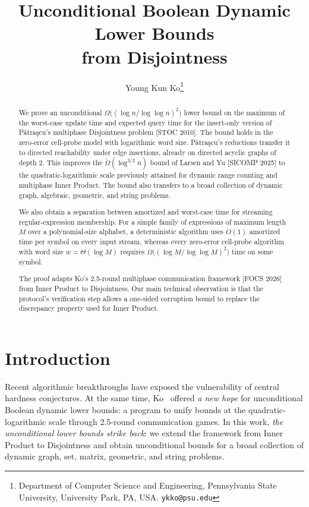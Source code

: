 \documentclass[11pt]{article}
\title{Unconditional Boolean Dynamic Lower Bounds \\from Disjointness}
\author{Young Kun Ko\thanks{Department of Computer Science and Engineering, Pennsylvania State University, University Park, PA, USA. \texttt{ykko@psu.edu}}}
\date{}
\theoremstyle{plain}
\theoremstyle{definition}
\theoremstyle{remark}
\begin{document}
\maketitle

\begin{abstract}
We prove an unconditional $\Omega\big((\log n/\log\log n)^2\big)$ lower bound on the maximum of the worst-case update time and expected query time for the insert-only version of Pătraşcu's multiphase Disjointness problem [STOC 2010]. The bound holds in the zero-error cell-probe model with logarithmic word size. Pătraşcu's reductions transfer it to directed reachability under edge insertions, already on directed acyclic graphs of depth $2$. This improves the $\widetilde\Omega(\log^{3/2} n)$ bound of Larsen and Yu [SICOMP 2025] to the quadratic-logarithmic scale previously attained for dynamic range counting and multiphase Inner Product. The bound also transfers to a broad collection of dynamic graph, algebraic, geometric, and string problems.

We also obtain a separation between amortized and worst-case time for streaming regular-expression membership. For a simple family of expressions of maximum length $M$ over a polynomial-size alphabet, a deterministic algorithm uses $O(1)$ amortized time per symbol on every input stream, whereas every zero-error cell-probe algorithm with word size $w=\Theta(\log M)$ requires $\Omega\big((\log M/\log\log M)^2\big)$ time on some symbol.

The proof adapts Ko's 2.5-round multiphase communication framework [FOCS 2026] from Inner Product to Disjointness. Our main technical observation is that the protocol's verification step allows a one-sided corruption bound to replace the discrepancy property used for Inner Product.
\end{abstract}

\newpage
\section{Introduction}\label{sec:intro}

Recent algorithmic breakthroughs have exposed the vulnerability of central hardness conjectures. At the same time, Ko~\cite{ko_omega_2026} offered \emph{a new hope} for unconditional Boolean dynamic lower bounds: a program to unify bounds at the quadratic-logarithmic scale through 2.5-round communication games. In this work, \emph{the unconditional lower bounds strike back}: we extend the framework from Inner Product to Disjointness and obtain unconditional bounds for a broad collection of dynamic graph, set, matrix, geometric, and string problems.
\end{document}
